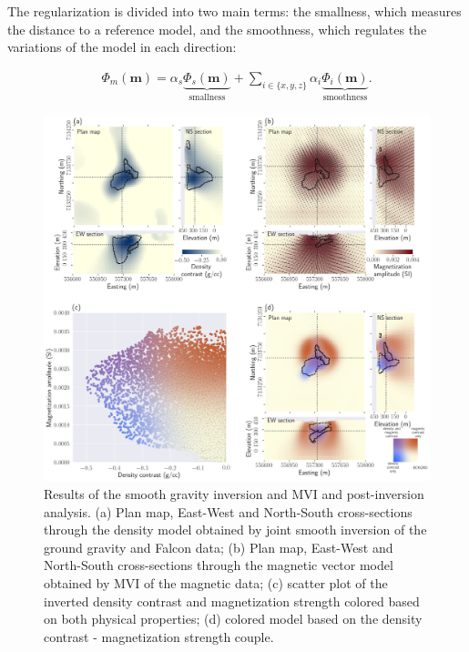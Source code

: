 \documentclass[paper, twocolumn]{geophysics} %
\begin{document}
The regularization is divided into two main terms: the smallness, which measures the distance to a reference model, and the smoothness, which regulates the variations of the model in each direction:

\begin{align}
\Phi_{m}(\mathbf{m})= \alpha_s \underbrace{\Phi_{s}(\mathbf{m})}_{\text{smallness}} + \sum_{i\in{\{x,y,z\}}}\alpha_i\underbrace{\Phi_{i}(\mathbf{m})}_{\text{smoothness}}.
\label{regularizer}
\end{align}


\begin{figure}
\centering
\includegraphics[width=\textwidth]{Figures/300dpi/Figure5.png}
\caption{Results of the smooth gravity inversion and MVI and post-inversion analysis. (a) Plan map, East-West and North-South cross-sections through the density model obtained by joint smooth inversion of the ground gravity and Falcon data; (b) Plan map, East-West and North-South cross-sections through the magnetic vector model obtained by MVI of the magnetic data; (c) scatter plot of the inverted density contrast and magnetization strength colored based on both physical properties; (d) colored model based on the density contrast - magnetization strength couple.}
\label{fig:Figure5.png}
\end{figure}
\end{document}

